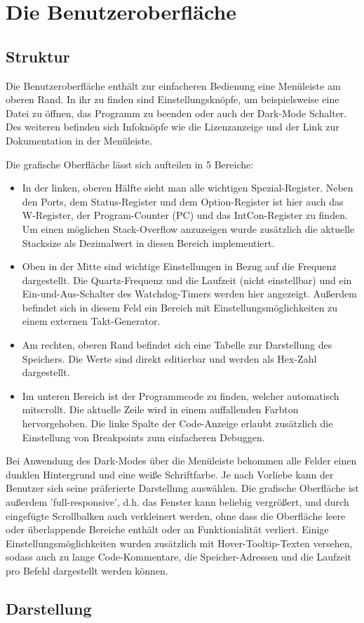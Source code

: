 \chapter{Die Benutzeroberfläche}
\section{Struktur}
Die Benutzeroberfläche enthält zur einfacheren Bedienung eine Menüleiste am oberen Rand. In ihr zu finden sind Einstellungsknöpfe, um beispielsweise eine Datei zu öffnen, das Programm zu beenden oder auch der Dark-Mode Schalter. Des weiteren befinden sich Infoknöpfe wie die Lizenzanzeige und der Link zur Dokumentation in der Menüleiste. 

\noindent Die grafische Oberfläche lässt sich aufteilen in 5 Bereiche: 
\begin{itemize}
\item In der linken, oberen Hälfte sieht man alle wichtigen Spezial-Register. Neben den Ports, dem Status-Register und dem Option-Register ist hier auch das W-Register, der Program-Counter (PC) und das IntCon-Register zu finden. Um einen möglichen Stack-Overflow anzuzeigen wurde zusätzlich die aktuelle Stacksize als Dezimalwert in diesen Bereich implementiert. 
\item Oben in der Mitte sind wichtige Einstellungen in Bezug auf die Frequenz dargestellt. Die Quartz-Frequenz und die Laufzeit (nicht einstellbar) und ein Ein-und-Aus-Schalter des Watchdog-Timers werden hier angezeigt. Außerdem befindet sich in diesem Feld ein Bereich mit Einstellungsmöglichkeiten zu einem externen Takt-Generator. 
\item Am rechten, oberen Rand befindet sich eine Tabelle zur Darstellung des Speichers. Die Werte sind direkt editierbar und werden als Hex-Zahl dargestellt. 
\item Im unteren Bereich ist der Programmcode zu finden, welcher automatisch mitscrollt. Die aktuelle Zeile wird in einem auffallenden Farbton hervorgehoben. Die linke Spalte der Code-Anzeige erlaubt zusätzlich die Einstellung von Breakpoints zum einfacheren Debuggen. 
\end{itemize}
Bei Anwendung des Dark-Modes über die Menüleiste bekommen alle Felder einen dunklen Hintergrund und eine weiße Schriftfarbe. Je nach Vorliebe kann der Benutzer sich seine präferierte Darstellung auswählen. Die grafische Oberfläche ist außerdem 'full-responsive', d.h. das Fenster kann beliebig vergrößert, und durch eingefügte Scrollbalken auch verkleinert werden, ohne dass die Oberfläche leere oder überlappende Bereiche enthält oder an Funktionialität verliert. 
Einige Einstellungsmöglichkeiten wurden zusätzlich mit Hover-Tooltip-Texten versehen, sodass auch zu lange Code-Kommentare, die Speicher-Adressen und die Laufzeit pro Befehl dargestellt werden können. 

\section{Darstellung}